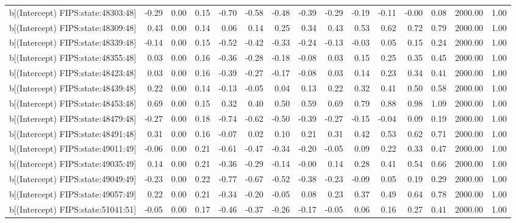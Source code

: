 \begin{table}[ht]
\begin{tabular}{rrrrrrrrrrrrrrr}
  b[(Intercept) FIPS:state:48303:48] & -0.29 & 0.00 & 0.15 & -0.70 & -0.58 & -0.48 & -0.39 & -0.29 & -0.19 & -0.11 & -0.00 & 0.08 & 2000.00 & 1.00 \\ 
  b[(Intercept) FIPS:state:48309:48] & 0.43 & 0.00 & 0.14 & 0.06 & 0.14 & 0.25 & 0.34 & 0.43 & 0.53 & 0.62 & 0.72 & 0.79 & 2000.00 & 1.00 \\ 
  b[(Intercept) FIPS:state:48339:48] & -0.14 & 0.00 & 0.15 & -0.52 & -0.42 & -0.33 & -0.24 & -0.13 & -0.03 & 0.05 & 0.15 & 0.24 & 2000.00 & 1.00 \\ 
  b[(Intercept) FIPS:state:48355:48] & 0.03 & 0.00 & 0.16 & -0.36 & -0.28 & -0.18 & -0.08 & 0.03 & 0.15 & 0.25 & 0.35 & 0.45 & 2000.00 & 1.00 \\ 
  b[(Intercept) FIPS:state:48423:48] & 0.03 & 0.00 & 0.16 & -0.39 & -0.27 & -0.17 & -0.08 & 0.03 & 0.14 & 0.23 & 0.34 & 0.41 & 2000.00 & 1.00 \\ 
  b[(Intercept) FIPS:state:48439:48] & 0.22 & 0.00 & 0.14 & -0.13 & -0.05 & 0.04 & 0.13 & 0.22 & 0.32 & 0.41 & 0.50 & 0.58 & 2000.00 & 1.00 \\ 
  b[(Intercept) FIPS:state:48453:48] & 0.69 & 0.00 & 0.15 & 0.32 & 0.40 & 0.50 & 0.59 & 0.69 & 0.79 & 0.88 & 0.98 & 1.09 & 2000.00 & 1.00 \\ 
  b[(Intercept) FIPS:state:48479:48] & -0.27 & 0.00 & 0.18 & -0.74 & -0.62 & -0.50 & -0.39 & -0.27 & -0.15 & -0.04 & 0.09 & 0.19 & 2000.00 & 1.00 \\ 
  b[(Intercept) FIPS:state:48491:48] & 0.31 & 0.00 & 0.16 & -0.07 & 0.02 & 0.10 & 0.21 & 0.31 & 0.42 & 0.53 & 0.62 & 0.71 & 2000.00 & 1.00 \\ 
  b[(Intercept) FIPS:state:49011:49] & -0.06 & 0.00 & 0.21 & -0.61 & -0.47 & -0.34 & -0.20 & -0.05 & 0.09 & 0.22 & 0.33 & 0.47 & 2000.00 & 1.00 \\ 
  b[(Intercept) FIPS:state:49035:49] & 0.14 & 0.00 & 0.21 & -0.36 & -0.29 & -0.14 & -0.00 & 0.14 & 0.28 & 0.41 & 0.54 & 0.66 & 2000.00 & 1.00 \\ 
  b[(Intercept) FIPS:state:49049:49] & -0.23 & 0.00 & 0.22 & -0.77 & -0.67 & -0.52 & -0.38 & -0.23 & -0.09 & 0.05 & 0.19 & 0.29 & 2000.00 & 1.00 \\ 
  b[(Intercept) FIPS:state:49057:49] & 0.22 & 0.00 & 0.21 & -0.34 & -0.20 & -0.05 & 0.08 & 0.23 & 0.37 & 0.49 & 0.64 & 0.78 & 2000.00 & 1.00 \\ 
  b[(Intercept) FIPS:state:51041:51] & -0.05 & 0.00 & 0.17 & -0.46 & -0.37 & -0.26 & -0.17 & -0.05 & 0.06 & 0.16 & 0.27 & 0.41 & 2000.00 & 1.00 \\ 

\end{tabular}
\end{table}
